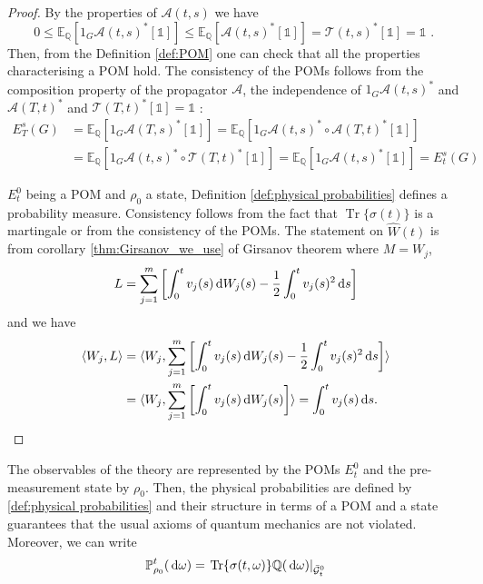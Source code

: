 \begin{proof}
	By the properties of $\mathcal{A}(t, s)$ we have \[ 0 \leq \mathbb{E}_{\mathbb{Q}}\left[1_{G} \mathcal{A}(t, s)^{*}[\mathbb{1}]\right] \leq \mathbb{E}_{\mathbb{Q}}\left[\mathcal{A}(t, s)^{*}[\mathbb{1}]\right]=\mathcal{T}(t, s)^{*}[\mathbb{1}]=\mathbb{1} \text { . } \]
	Then, from the Definition \eqref{def:POM} one can check that all the properties characterising a POM hold. The consistency of the POMs follows from the composition property of the propagator $\mathcal{A}$, the independence of $1_{G} \mathcal{A}(t, s)^{*}$ and $\mathcal{A}(T, t)^{*}$ and $\mathcal{T}(T, t)^{*}[\mathbb{1}]=\mathbb{1}$ :
\[ \begin{aligned}
 E_{T}^{s}(G) &=\mathbb{E}_{\mathbb{Q}}\left[1_{G} \mathcal{A}(T, s)^{*}[\mathbb{1}]\right]=\mathbb{E}_{\mathbb{Q}}\left[1_{G} \mathcal{A}(t, s)^{*} \circ \mathcal{A}(T, t)^{*}[\mathbb{1}]\right] \\ &=\mathbb{E}_{\mathbb{Q}}\left[1_{G} \mathcal{A}(t, s)^{*} \circ \mathcal{T}(T, t)^{*}[\mathbb{1}]\right]=\mathbb{E}_{\mathbb{Q}}\left[1_{G} \mathcal{A}(t, s)^{*}[\mathbb{1}]\right]=E_{t}^{s}(G) \end{aligned} \]

 $E_{t}^{0}$ being a POM and $\rho_{0}$ a state, Definition \eqref{def:physical probabilities} defines a probability measure. Consistency follows from the fact that $\operatorname{Tr}\{\sigma(t)\}$ is a martingale or from the consistency of the POMs.
  The statement on $\widehat{W}(t)$ is from corollary \ref{thm:Girsanov_we_use} of Girsanov theorem where $ M = W_j $,
 \[  L = \sum_{j=1}^{m} \left[ \int_{0}^{t} v_{j}(s) \,\mathrm{d} W_{j}(s)-\frac{1}{2} \int_{0}^{t} v_{j}(s)^{2} \,\mathrm{d} s\right]  \]
 and we have
 \[
 \begin{aligned}
 \langle W_j, L\rangle &= \langle W_j, \sum_{j=1}^{m} \left[ \int_{0}^{t} v_{j}(s) \,\mathrm{d} W_{j}(s)-\frac{1}{2} \int_{0}^{t} v_{j}(s)^{2} \,\mathrm{d} s\right] \rangle \\
 & =\langle W_j, \sum_{j=1}^{m} \left[ \int_{0}^{t} v_{j}(s) \,\mathrm{d} W_{j}(s)\right] \rangle = \int_{0}^{t} v_{j}(s) \,\mathrm{d} s.
 \end{aligned}
 \]
\end{proof}

The observables of the theory are represented by the POMs $E_{t}^{0}$ and the pre-measurement state by $\rho_{0}$. Then, the physical probabilities are defined by \eqref{def:physical probabilities} and their structure in terms of a $\mathrm{POM}$ and a state guarantees that the usual axioms of quantum mechanics are not violated. Moreover, we can write
\[ \mathbb{P}_{\rho_{0}}^{t}(\,\mathrm{d} \omega)=\left.\operatorname{Tr}\{\sigma(t, \omega)\} \mathbb{Q}(\,\mathrm{d} \omega)\right|_{\bar{\mathcal{G}}_{t}^{0}} \]

